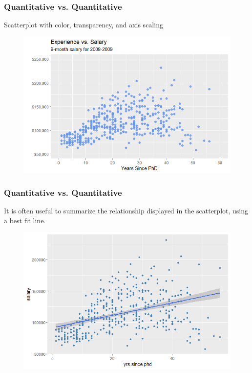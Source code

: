 \documentclass{beamer}
\begin{document}

\begin{frame}[fragile] %
\frametitle{ Quantitative vs. Quantitative}

\begin{example} 

Scatterplot with color, transparency, and axis scaling

\end{example}
\begin{figure}
\includegraphics[width=0.8\linewidth]{Seminar_3_images/R/05.png}
\end{figure}
\end{frame}


\begin{frame}[fragile] %
\frametitle{Quantitative vs. Quantitative}

\begin{example} 
It is often useful to summarize the relationship displayed in the scatterplot, using a best fit line.

\end{example}
\begin{figure}
\includegraphics[width=0.75\linewidth]{Seminar_3_images/R/06.png}
\end{figure}
\end{frame}
\end{document}
